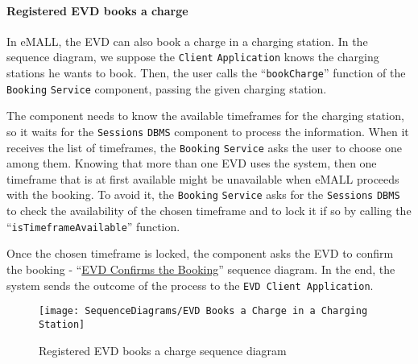 \paragraph{Registered EVD books a charge}
In eMALL, the EVD can also book a charge in a charging station.
In the sequence diagram, we suppose the \verb|Client| \verb|Application| knows the charging stations he wants to book.
Then, the user calls the ``\verb|bookCharge|'' function of the \verb|Booking| \verb|Service| component, passing the given charging station.

The component needs to know the available timeframes for the charging station, so it waits for the \verb|Sessions| \verb|DBMS| component to process the information.
When it receives the list of timeframes, the \verb|Booking| \verb|Service| asks the user to choose one among them.
Knowing that more than one EVD uses the system, then one timeframe that is at first available might be unavailable when eMALL proceeds with the booking.
To avoid it, the \verb|Booking| \verb|Service| asks for the \verb|Sessions| \verb|DBMS| to check the availability of the chosen timeframe and to lock it if so by calling the ``\verb|isTimeframeAvailable|'' function.

Once the chosen timeframe is locked, the component asks the EVD to confirm the booking - ``\hyperlink{evdconfirmsbooking}{EVD Confirms the Booking}'' sequence diagram.
In the end, the system sends the outcome of the process to the \verb|EVD Client Application|.
\begin{figure}[H]
    \begin{center}
        \texttt{[image: SequenceDiagrams/EVD Books a Charge in a Charging Station]}
        \caption{Registered EVD books a charge sequence diagram}
        \label{fig:evd_books_charge_charging_station}
    \end{center}
\end{figure}

